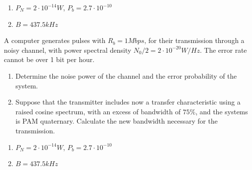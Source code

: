 \documentclass[es,boletin]{uah}
\begin{document}
{
\begin{enumerate}
	\item $P_N = 2 \cdot 10^{-14} W$, $P_b = 2.7 \cdot 10^{-10}$
	\item $B=437.5 kHz$
\end{enumerate}
}
{
A computer generates pulses with $R_b = 1 Mbps$, for their transmission through a noisy channel, with power spectral density $N_0/2 = 2\cdot 10^{-20} W/Hz$. The error rate cannot be over 1 bit per hour.

\begin{enumerate}
	\item Determine the noise power of the channel and the error probability of the system.
	\item Suppose that the transmitter includes now a transfer characteristic using a raised cosine spectrum, with an excess of bandwidth of $75\%$, and the systems is PAM quaternary. Calculate the new bandwidth necessary for the transmission.
\end{enumerate}
}
{

\begin{enumerate}
	\item $P_N = 2 \cdot 10^{-14} W$, $P_b = 2.7 \cdot 10^{-10}$
	\item $B=437.5 kHz$
\end{enumerate}
}
\end{document}
